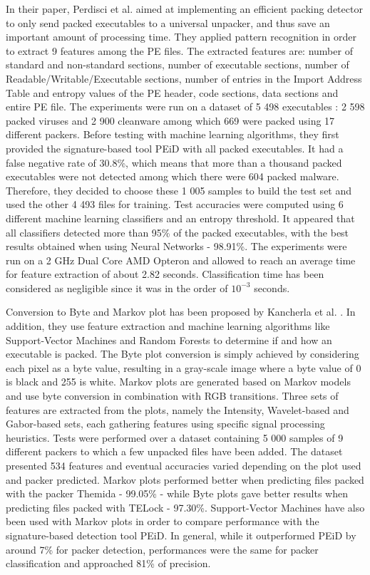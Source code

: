 In their paper, Perdisci et al. \cite{perdisci_classification_2008} aimed at implementing an efficient packing detector to only send packed executables to a universal unpacker, and thus save an important amount of processing time. They applied pattern recognition in order to extract 9 features among the PE files. The extracted features are: number of standard and non-standard sections, number of executable sections, number of Readable/Writable/Executable sections, number of entries in the Import Address Table and entropy values of the PE header, code sections, data sections and entire PE file. The experiments were run on a dataset of 5 498 executables : 2 598 packed viruses and 2 900 cleanware among which 669 were packed using 17 different packers. Before testing with machine learning algorithms, they first provided the signature-based tool PEiD \cite{peid} with all packed executables. It had a false negative rate of 30.8\%, which means that more than a thousand packed executables were not detected among which there were 604 packed malware. Therefore, they decided to choose these 1 005 samples to build the test set and used the other 4 493 files for training. Test accuracies were computed using 6 different machine learning classifiers and an entropy threshold. It appeared that all classifiers detected more than 95\% of the packed executables, with the best results obtained when using Neural Networks - 98.91\%. The experiments were run on a 2 GHz Dual Core AMD Opteron and allowed to reach an average time for feature extraction of about 2.82 seconds. Classification time has been considered as negligible since it was in the order of $10^{-3}$ seconds.

Conversion to Byte and Markov plot has been proposed by Kancherla et al. \cite{kancherla_packer_2016}. In addition, they use feature extraction and machine learning algorithms like Support-Vector Machines and Random Forests to determine if and how an executable is packed. The Byte plot conversion is simply achieved by considering each pixel as a byte value, resulting in a gray-scale image where a byte value of 0 is black and 255 is white. Markov plots are generated based on Markov models and use byte conversion in combination with RGB transitions. Three sets of features are extracted from the plots, namely the Intensity, Wavelet-based and Gabor-based sets, each gathering features using specific signal processing heuristics. Tests were performed over a dataset containing 5 000 samples of 9 different packers to which a few unpacked files have been added. The dataset presented 534 features and eventual accuracies varied depending on the plot used and packer predicted. Markov plots performed better when predicting files packed with the packer Themida - 99.05\% - while Byte plots gave better results when predicting files packed with TELock - 97.30\%. Support-Vector Machines have also been used with Markov plots in order to compare performance with the signature-based detection tool PEiD. In general, while it outperformed PEiD by around 7\% for packer detection, performances were the same for packer classification and approached 81\% of precision.

